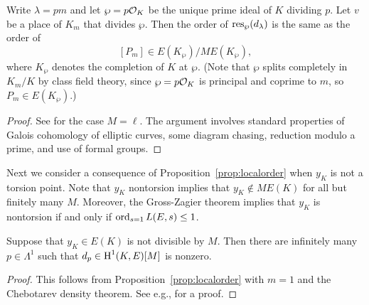 \begin{proposition}\label{prop:localorder}
Write $\lambda = p m$ and let $\wp = p\mathcal{O}_K $ be the unique prime ideal
of $K$ dividing $p$.   Let $v$ be a place of $K_m$ that divides $\wp$.
Then the order of
$
  \operatorname{res}_\wp(d_\lambda)
$ is
the same as the order
of 
$$
[P_m] \in E(K_\wp)/M E(K_{\wp}),
$$
where $K_\wp$ denotes the completion of $K$ at $\wp$.
(Note that $\wp$ splits completely in $K_m/K$ by class
field theory, since 
$\wp = p\mathcal{O}_K$ is principal and coprime to $m$, so 
$P_m \in E(K_\wp)$.)
\end{proposition}
\begin{proof}
See \cite[Prop.~6.2]{gross:kolyvagin} for the case $M=\ell$.  The
argument involves standard properties of Galois cohomology
of elliptic curves, some diagram chasing, reduction
modulo a prime, and use of formal groups.
\end{proof}

Next we consider a consequence of Proposition~\ref{prop:localorder}
when $y_K$ is not a torsion point.  Note that $y_K$ nontorsion implies
that $y_K \not \in M E(K)$ for all but finitely many $M$.  Moreover,
the Gross-Zagier theorem implies %
that $y_K$ is nontorsion if and only if $\operatorname{ord}_{s=1} L(E,s) \leq 1$.


\begin{proposition}\label{prop:nonzeroheegner}
Suppose that $y_K \in E(K)$ is not divisible by $M$.
Then there are infinitely many $p\in\Lambda^1$
such that  $d_{p} \in \operatorname{H}^1(K,E)[M]$ is nonzero.
\end{proposition}
\begin{proof}
This follows from 
Proposition~\ref{prop:localorder} with $m=1$
and the Chebotarev density
theorem.   See e.g., \cite[\S4.1]{stein:index} for a proof.
\end{proof}

